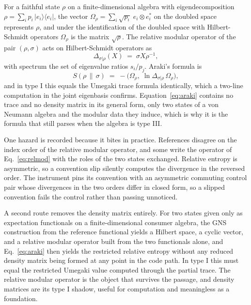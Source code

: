 \documentclass[aps,prd,reprint,nofootinbib,longbibliography]{revtex4-2}
\begin{document}
For a faithful state $\rho$ on a finite-dimensional algebra with
eigendecomposition $\rho=\sum_i p_i\,|e_i\rangle\langle e_i|$, the vector
$\Omega_\rho=\sum_i \sqrt{p_i}\;e_i\otimes e_i^{*}$ on the doubled space
represents $\rho$, and under the identification of the doubled space with
Hilbert-Schmidt operators $\Omega_\rho$ is the matrix $\sqrt{\rho}$.  The
relative modular operator of the pair $(\rho,\sigma)$ acts on
Hilbert-Schmidt operators as
\begin{equation}
\Delta_{\sigma|\rho}(X) \;=\; \sigma X \rho^{-1},
\label{eq:relmod}
\end{equation}
with spectrum the set of eigenvalue ratios $s_i/p_j$.  Araki's formula
\cite{Araki1976} is
\begin{equation}
S(\rho\,\|\,\sigma) \;=\;
-\bigl(\Omega_\rho,\;\ln\Delta_{\sigma|\rho}\,\Omega_\rho\bigr),
\label{eq:araki}
\end{equation}
and in type I this equals the Umegaki trace formula identically, which a
two-line computation in the joint eigenbasis confirms.
Equation~\eqref{eq:araki} contains no trace and no density matrix in its
general form, only two states of a von Neumann algebra and the modular
data they induce, which is why it is the formula that still parses when
the algebra is type III.

One hazard is recorded because it bites in practice.  References disagree
on the index order of the relative modular operator, and some write the
operator of Eq.~\eqref{eq:relmod} with the roles of the two states
exchanged.  Relative entropy is asymmetric, so a convention slip silently
computes the divergence in the reversed order.  The instrument pins its
convention with an asymmetric commuting control pair whose divergences in
the two orders differ in closed form, so a slipped convention fails the
control rather than passing unnoticed.

A second route removes the density matrix entirely.  For two states given
only as expectation functionals on a finite-dimensional consumer algebra,
the GNS construction from the reference functional yields a Hilbert
space, a cyclic vector, and a relative modular operator built from the
two functionals alone, and Eq.~\eqref{eq:araki} then yields the
restricted relative entropy without any reduced density matrix being
formed at any point in the code path.  In type I this must equal the
restricted Umegaki value computed through the partial trace.  The
relative modular operator is the object that
survives the passage, and density matrices are its type I shadow, useful
for computation and meaningless as a foundation.
\end{document}
